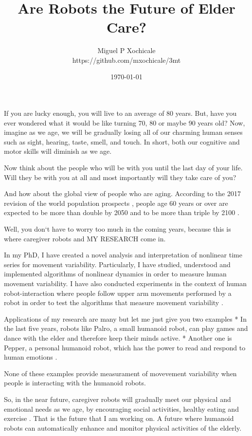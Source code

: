 \documentclass[12pt]{article}
\title{ Are Robots the Future of Elder Care?  }
\author{Miguel P Xochicale \\
https://github.com/mxochicale/3mt}
\date{\today}
\begin{document}
\maketitle

If you are lucky enough, you will live to an average of 80 years.
But, have you ever wondered what it would be like turning 70, 80 or maybe 90 years old?
Now, imagine as we age, we will be gradually losing all of our
charming human senses such as sight, hearing, taste, smell, and touch.
In short, both our cognitive and motor skills will diminish as we age.

Now think about the people who will be with you until the last day of your life.
Will they be with you at all 
and most importantly will they take care of you?

And how about the global view of people who are aging.
According to the 2017 revision of the world population prospects \cite{un2017}, 
people age 60 years or over
are expected to be more than double by 2050 and to be more than triple by 2100 \cite{unb2017}.

Well, you don`t have to worry too much in the coming years, 
because this is where caregiver robots and MY RESEARCH come in.

In my PhD, 
I have created a novel analysis and interpretation of nonlinear time series
for movement variability.
Particularly,
I have studied, understood and implemented algorithms of nonlinear dynamics
in order to measure human movement variability.
I have also conducted experiments in the context of human robot-interaction 
where people follow upper arm movements performed by a robot 
in order to test the algorithms that measure movement variability \cite{xochicale2018}.

Applications of my research are many but let me just give you two examples
* In the last five years, 
robots like Palro, a small humanoid robot, can play games and dance with the elder
and therefore keep their minds active.
* Another one is Pepper, a personal humanoid robot, which has the power 
to read and respond to human emotions \cite{hay2015}.

None of these examples provide measurament of movevement variability 
when people is interacting with the humanoid robots.

So, in the near future, caregiver robots will gradually meet our physical and emotional needs as we age, 
by encouraging social activities, healthy eating and exercise \cite{aronson2014}.
That is the future that I am working on.
A future where humanoid robots can automatically enhance and monitor physical activities of the elderly.
\end{document}
